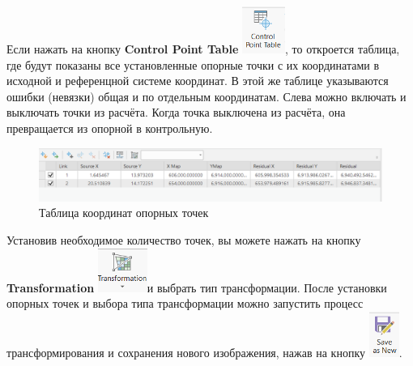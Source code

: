 \documentclass[
  12pt,
]{book}
\begin{document}
Если нажать на кнопку \textbf{Control Point Table} \includegraphics{images/Ref02/Arc_control_points_tab.png}, то откроется таблица, где будут показаны все установленные опорные точки с их координатами в исходной и референцной системе координат. В этой же таблице указываются ошибки (невязки) общая и по отдельным координатам. Слева можно включать и выключать точки из расчёта. Когда точка выключена из расчёта, она превращается из опорной в контрольную.

\begin{figure}
\centering
\includegraphics{images/Ref02/Arc_table.png}
\caption{Таблица координат опорных точек}
\end{figure}

Установив необходимое количество точек, вы можете нажать на кнопку \textbf{Transformation} \includegraphics{images/Ref02/Arc_transformation.png}и выбрать тип трансформации. После установки опорных точек и выбора типа трансформации можно запустить процесс трансформирования и сохранения нового изображения, нажав на кнопку \includegraphics{images/Ref02/Arc_save_as_new.png}.
\end{document}
